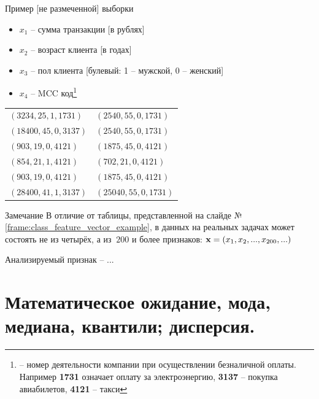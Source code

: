   \begin{frame}{Пример [не размеченной] выборки}\label{frame:class_feature_vector_example}
	\begin{itemize}
		\item $x_1$ -- сумма транзакции [в рублях]
		\item $x_2$ -- возраст клиента [в годах]
		\item $x_3$ -- пол клиента [булевый: 1 -- мужской, 0 -- женский]
		\item $x_4$ -- MCC код\footnote{ -- номер деятельности компании при осуществлении безналичной оплаты. Например \textbf{1731} означает оплату за электроэнергию, \textbf{3137} -- покупка авиабилетов, \textbf{4121} -- такси}
	\end{itemize}
	\begin{center}\small \begin{tabular}{ l l }
			$(3234, 25, 1, 1731) $ &  $(2540, 55, 0, 1731)$ \\
			$(18400, 45, 0, 3137)$ & $(2540, 55, 0, 1731)$  \\
			$(903, 19, 0, 4121)$  & $(1875, 45, 0, 4121)$  \\
			$(854, 21, 1, 4121)$  & $(702, 21, 0, 4121)$  \\
			$(903, 19, 0, 4121)$  & $(1875, 45, 0, 4121)$  \\
			$(28400, 41, 1, 3137)$ & $(25040, 55, 0, 1731)$  \\
	\end{tabular}\end{center}
\end{frame}

 \begin{frame}
	\begin{block}{Замечание}
		В отличие от таблицы, представленной на слайде №\ref{frame:class_feature_vector_example},
		в данных на реальных задачах  может состоять не из четырёх, а из $~200$ и более признаков:
		$\bold x = (x_1, x_2, ..., x_{200}, ...)$
	\end{block}
	
	Анализируемый признак -- ...

\end{frame}


\section{Математическое ожидание, мода, медиана, квантили; дисперсия.}\label{section:base_statistic}

